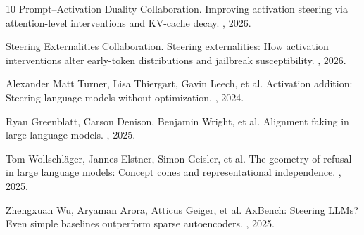 \documentclass{article}
\begin{document}
\begin{thebibliography}{10}
Prompt--Activation Duality Collaboration.
\newblock Improving activation steering via attention-level interventions and KV-cache decay.
, 2026.

Steering Externalities Collaboration.
\newblock Steering externalities: How activation interventions alter early-token distributions and jailbreak susceptibility.
, 2026.

Alexander Matt Turner, Lisa Thiergart, Gavin Leech, et al.
\newblock Activation addition: Steering language models without optimization.
, 2024.

Ryan Greenblatt, Carson Denison, Benjamin Wright, et al.
\newblock Alignment faking in large language models.
, 2025.

Tom Wollschl\"ager, Jannes Elstner, Simon Geisler, et al.
\newblock The geometry of refusal in large language models: Concept cones and representational independence.
, 2025.

Zhengxuan Wu, Aryaman Arora, Atticus Geiger, et al.
\newblock AxBench: Steering LLMs? Even simple baselines outperform sparse autoencoders.
, 2025.

\end{thebibliography}
\end{document}
